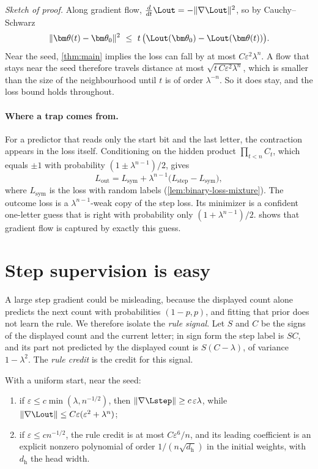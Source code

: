 \emph{Sketch of proof.} Along gradient flow, $\frac{d}{dt}\Lout=-\|\nabla\Lout\|^2$, so by Cauchy--Schwarz
\[
 \|\bm\theta(t)-\bm\theta_0\|^2\ \le\ t\,\bigl(\Lout(\bm\theta_0)-\Lout(\bm\theta(t))\bigr).
\]
Near the seed, \cref{thm:main} implies the loss can fall by at most $C\varepsilon^2\lambda^n$. A flow that stays
near the seed therefore travels distance at most $\sqrt{t\,C\varepsilon^2\lambda^n}$, which is smaller than the
size of the neighbourhood until $t$ is of order $\lambda^{-n}$. So it does stay, and the loss bound
holds throughout.

\paragraph{Where a trap comes from.} For a predictor that reads only the start bit and the last
letter, the contraction appears in the loss itself. Conditioning on the hidden product
$\prod_{t<n}C_t$, which equals $\pm1$ with probability $(1\pm\lambda^{n-1})/2$, gives
\begin{equation}
 L_{\mathrm{out}}=L_{\mathrm{sym}}+\lambda^{n-1}\bigl(L_{\mathrm{step}}-L_{\mathrm{sym}}\bigr),
 \label{eq:binary-loss-mixture}
\end{equation}
where $L_{\mathrm{sym}}$ is the loss with random labels (\cref{lem:binary-loss-mixture}). The outcome loss is a
$\lambda^{n-1}$-weak copy of the step loss. Its minimizer is a confident one-letter guess that is right with
probability only $(1+\lambda^{n-1})/2$.  shows that gradient flow is captured by exactly this guess.

\section{Step supervision is easy}
\label{sec:step}

A large step gradient could be misleading, because the displayed count alone predicts the next count
with probabilities $(1-p,p)$, and fitting that prior does not learn the rule. We therefore isolate the
\emph{rule signal}. Let $S$ and $C$ be the signs of the displayed count and the current letter; in sign form the step
label is $SC$, and its part not predicted by the displayed count is $S(C-\lambda)$, of variance $1-\lambda^2$. The \emph{rule credit} is the credit
for this signal.

\begin{theorem}
\label{thm:separation}
With a uniform start, near the seed:
\begin{enumerate}[label=(\roman*),leftmargin=*,itemsep=0pt,topsep=2pt]
\item if $\varepsilon\le c\min(\lambda,n^{-1/2})$, then $\|\nabla\Lstep\|\ge c\,\varepsilon\lambda$, while $\|\nabla\Lout\|\le C\varepsilon(\varepsilon^2+\lambda^n)$;
\item if $\varepsilon\le cn^{-1/2}$, the rule credit is at most $C\varepsilon^6/n$, and its leading coefficient is an explicit nonzero polynomial
of order $1/(n\sqrt{d_{\mathrm h}})$ in the initial weights, with $d_{\mathrm h}$ the head width.
\end{enumerate}
\end{theorem}

